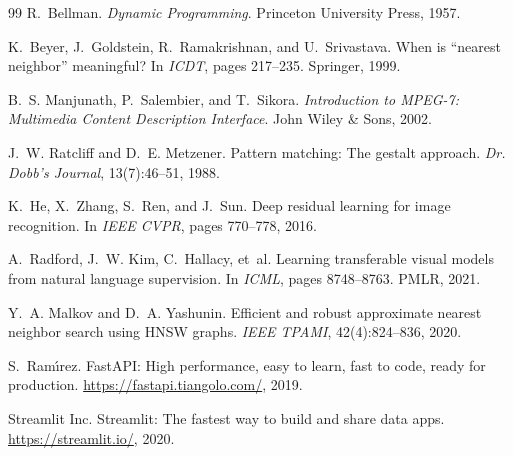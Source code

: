 \documentclass[11pt,a4paper,oneside]{report}
\theoremstyle{definition}
\begin{document}
\begin{thebibliography}{99}
R.~Bellman.
\newblock \emph{Dynamic Programming}.
\newblock Princeton University Press, 1957.

K.~Beyer, J.~Goldstein, R.~Ramakrishnan, and U.~Srivastava.
\newblock When is ``nearest neighbor'' meaningful?
\newblock In \emph{ICDT}, pages 217--235. Springer, 1999.

B.~S. Manjunath, P.~Salembier, and T.~Sikora.
\newblock \emph{Introduction to MPEG-7: Multimedia Content Description Interface}.
\newblock John Wiley \& Sons, 2002.

J.~W. Ratcliff and D.~E. Metzener.
\newblock Pattern matching: The gestalt approach.
\newblock \emph{Dr. Dobb's Journal}, 13(7):46--51, 1988.

K.~He, X.~Zhang, S.~Ren, and J.~Sun.
\newblock Deep residual learning for image recognition.
\newblock In \emph{IEEE CVPR}, pages 770--778, 2016.

A.~Radford, J.~W. Kim, C.~Hallacy, et~al.
\newblock Learning transferable visual models from natural language supervision.
\newblock In \emph{ICML}, pages 8748--8763. PMLR, 2021.

Y.~A. Malkov and D.~A. Yashunin.
\newblock Efficient and robust approximate nearest neighbor search using HNSW graphs.
\newblock \emph{IEEE TPAMI}, 42(4):824--836, 2020.

S.~Ram{\'\i}rez.
\newblock FastAPI: High performance, easy to learn, fast to code, ready for production.
\newblock \url{https://fastapi.tiangolo.com/}, 2019.

Streamlit Inc.
\newblock Streamlit: The fastest way to build and share data apps.
\newblock \url{https://streamlit.io/}, 2020.

\end{thebibliography}
\end{document}
